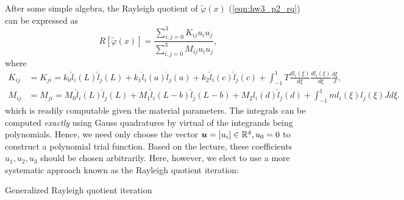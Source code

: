 \begin{enumerate}[(i)]
{    After some simple algebra, the Rayleigh quotient of $\tilde{\varphi}(x)$ (\cref{eqn:hw3_p2_rq}) can be expressed as 
    \begin{equation}\label{eqn:hw3_p2_rq_poly}
        R[\tilde{\varphi}(x)] = \frac{\sum_{i,j=0}^3 K_{ij}u_i u_j}{\sum_{i,j=0}^3 M_{ij}u_i u_j},
    \end{equation}
    where 
    \begin{equation}\label{eqn:hw3_p2_KM}
    \begin{aligned}
        K_{ij} &= K_{ji} = k_0 \hat{l}_i(L) \hat{l}_j(L) + k_1 \hat{l}_i(a) \hat{l}_j(a) + k_2 \hat{l}_i(c) \hat{l}_j(c) + \int_{-1}^1 T \frac{dl_i(\xi)}{d\xi} \frac{dl_i(\xi)}{d\xi} \frac{d\xi}{J}, \\
        M_{ij} &= M_{ji} = M_0 \hat{l}_i(L) \hat{l}_j(L) + M_1 \hat{l}_i(L-b) \hat{l}_j(L-b) + M_2 \hat{l}_i(d) \hat{l}_j(d) + \int_{-1}^1 m l_i(\xi) l_j(\xi) J d\xi.
    \end{aligned}
    \end{equation}
    which is readily computable given the material parameters. 
    The integrals can be computed \emph{exactly} using Gauss quadratures by virtual of the integrands being polynomials. 
    Hence, we need only choose the vector $\bm{u} = [u_i] \in \mathbb{R}^4, u_0 = 0$ to construct a polynomial trial function. 
    Based on the lecture, these coefficients $u_1, u_2, u_3$ should be chosen arbitrarily. 
    Here, however, we elect to use a more systematic approach known as the Rayleigh quotient iteration:
    \begin{algorithm}[!ht]
        \caption{Generalized Rayleigh quotient iteration}
        \begin{algorithmic}
        \label{alg:hw3_p2_rq_iter}
        \setlength{\lineskip}{4pt}
        \EndFor
        \end{algorithmic}
    \end{algorithm}

}
\end{enumerate}

